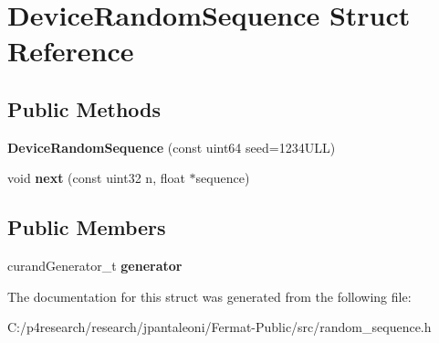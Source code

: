 \hypertarget{struct_device_random_sequence}{}\section{Device\+Random\+Sequence Struct Reference}
\label{struct_device_random_sequence}
\subsection*{Public Methods}
\begin{DoxyCompactItemize}
\item 
\mbox{\label{struct_device_random_sequence_a6c30fd590c48c31b7a95698ec7f26888}} 
{\bfseries Device\+Random\+Sequence} (const uint64 seed=1234\+U\+L\+L)
\item 
\mbox{\label{struct_device_random_sequence_a2a0cfde5db367db9258d01ca1b6af742}} 
void {\bfseries next} (const uint32 n, float $\ast$sequence)
\end{DoxyCompactItemize}
\subsection*{Public Members}
\begin{DoxyCompactItemize}
\item 
\mbox{\label{struct_device_random_sequence_a4cca375700915de7e14c6b13ab09a1b9}} 
curand\+Generator\+\_\+t {\bfseries generator}
\end{DoxyCompactItemize}


The documentation for this struct was generated from the following file\+:\begin{DoxyCompactItemize}
\item 
C\+:/p4research/research/jpantaleoni/\+Fermat-\/\+Public/src/random\+\_\+sequence.\+h\end{DoxyCompactItemize}
